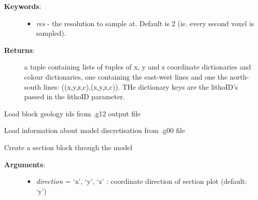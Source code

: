 \documentclass[a4paper,10pt,english]{sphinxmanual}
\begin{document}
\begin{fulllineitems}
\begin{fulllineitems}
\begin{description}
\begin{itemize}
\begin{description}
\end{description}

\end{itemize}

\item[{\textbf{Keywords}:}] \leavevmode\begin{itemize}
\item {} 
\emph{res} - the resolution to sample at. Default is 2 (ie. every second voxel is sampled).

\end{itemize}

\item[{\textbf{Returns}:}] \leavevmode
a tuple containing lists of tuples of x, y and z coordinate dictionaries and colour dictionaries, 
one containing the east-west lines and one the north-south lines: ((x,y,z,c),(x,y,z,c)). THe dictionary
keys are the lithoID's passed in the lithoID parameter.

\end{description}

\end{fulllineitems}


\begin{fulllineitems}
\label{pynoddy:pynoddy.output.NoddyOutput.load_geology}
Load block geology ids from .g12 output file

\end{fulllineitems}


\begin{fulllineitems}
\label{pynoddy:pynoddy.output.NoddyOutput.load_model_info}
Load information about model discretisation from .g00 file

\end{fulllineitems}


\begin{fulllineitems}
\label{pynoddy:pynoddy.output.NoddyOutput.plot_section}
Create a section block through the model
\begin{description}
\item[{\textbf{Arguments}:}] \leavevmode\begin{itemize}
\item {} 
\emph{direction} = `x', `y', `z' : coordinate direction of section plot (default: `y')


\end{itemize}
\end{description}
\end{fulllineitems}
\end{fulllineitems}
\end{document}
